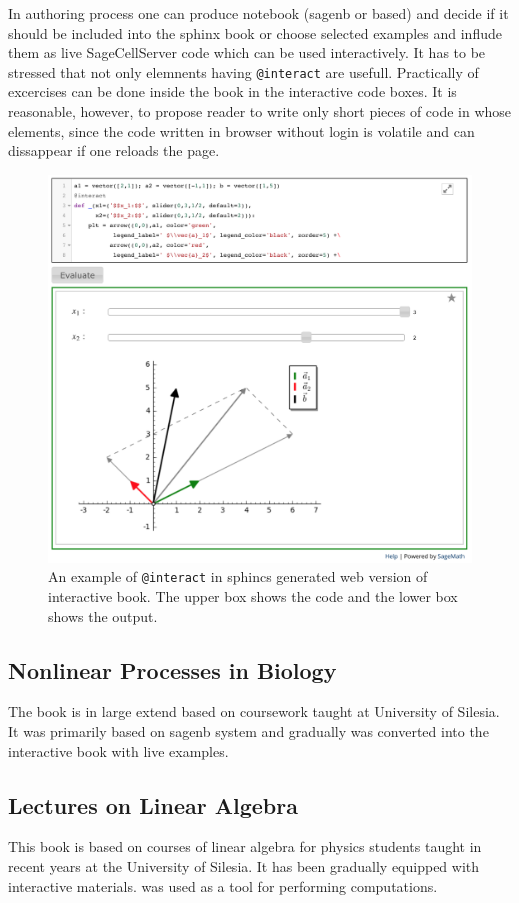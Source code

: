 \documentclass{deliverablereport}
\begin{document}
In authoring process one can produce notebook (sagenb or \Jupyter
based) and decide if it should be included into the sphinx book or
choose selected examples and influde them as live SageCellServer code
which can be used interactively. It has to be stressed that not only
elemnents having \texttt{@interact} are usefull. Practically of
excercises can be done inside the book in the interactive code
boxes. It is reasonable, however, to propose reader to write only
short pieces of code in whose elements, since the code written in
browser without login is volatile and can dissappear if one reloads
the page.

\begin{figure}
\centerline{\includegraphics[width=1.0\textwidth]{interact_in_sphinx.png}}
\caption{\label{fig:jupyterdemo} An example of \texttt{@interact} in
  sphincs generated web version of interactive book. The upper box
  shows the code and the lower box shows the output.}
\end{figure}


\subsection{ Nonlinear Processes in Biology }

The book is in large extend based on coursework taught at University
of Silesia. It was primarily based on sagenb system and gradually was
converted into the interactive book with live examples. 

\subsection{Lectures on Linear Algebra}

This book is based on courses of linear algebra for physics students
taught in recent years at the University of Silesia. It has been
gradually equipped with interactive materials. \Sage was used as a
tool for performing computations. 
\end{document}
